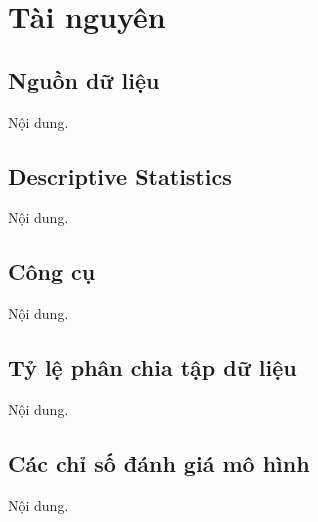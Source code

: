 \section{Tài nguyên}
\subsection{Nguồn dữ liệu}
Nội dung.

\subsection{Descriptive Statistics}
Nội dung.

\subsection{Công cụ}
Nội dung.

\subsection{Tỷ lệ phân chia tập dữ liệu}
Nội dung.

\subsection{Các chỉ số đánh giá mô hình}
Nội dung.
